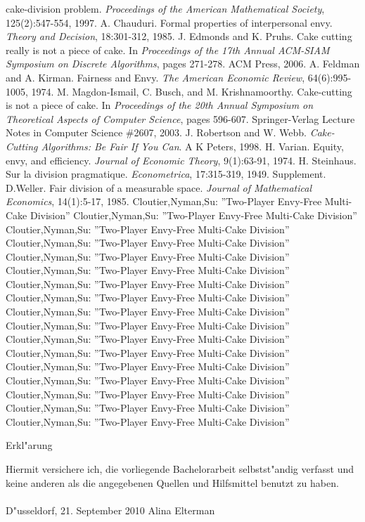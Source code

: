 \documentclass[11pt, a4paper, twoside]{article}
\newcommand{\tf}{\color{black}}
\numberwithin{equation}{section}
\begin{document}
\begin{thebibliography}{9}
cake-division problem. \emph{Proceedings of the American Mathematical Society}, 125(2):547-554,
1997.
\bibitem[Cha85]{} A. Chauduri. Formal properties of interpersonal envy. \emph{Theory and Decision}, 18:301-312, 1985.
\bibitem[EP06b]{} J. Edmonds and K. Pruhs. Cake cutting really is not a piece of cake. In \emph{Proceedings of the 17th
Annual ACM-SIAM Symposium on Discrete Algorithms}, pages 271-278. ACM Press, 2006.
\bibitem[FK74]{} A. Feldman and A. Kirman. Fairness and Envy. \emph{The American Economic Review}, 64(6):995-1005, 1974.
\bibitem[MIBK03]{} M. Magdon-Ismail, C. Busch, and M. Krishnamoorthy. Cake-cutting is not a piece of cake. In \emph{Proceedings of the 20th Annual Symposium on Theoretical Aspects of Computer Science}, pages 596-607. Springer-Verlag Lecture Notes in Computer Science \#2607, 2003.
\bibitem[RW98]{} J. Robertson and W. Webb. \emph{Cake-Cutting Algorithms: Be Fair If You Can}. A K Peters, 1998.
\bibitem[Var74]{} H. Varian. Equity, envy, and efficiency. \emph{Journal of Economic Theory}, 9(1):63-91, 1974.
\bibitem[Ste49]{} H. Steinhaus. Sur la division pragmatique. \emph{Econometrica}, 17:315-319, 1949. Supplement.
\bibitem[Wel85]{} D.Weller. Fair division of a measurable space. \emph{Journal of Mathematical Economics}, 14(1):5-17,
1985.
Cloutier,Nyman,Su:
''Two-Player Envy-Free Multi-Cake Division''
Cloutier,Nyman,Su:
''Two-Player Envy-Free Multi-Cake Division''
Cloutier,Nyman,Su:
''Two-Player Envy-Free Multi-Cake Division''
Cloutier,Nyman,Su:
''Two-Player Envy-Free Multi-Cake Division''
Cloutier,Nyman,Su:
''Two-Player Envy-Free Multi-Cake Division''
Cloutier,Nyman,Su:
''Two-Player Envy-Free Multi-Cake Division''
Cloutier,Nyman,Su:
''Two-Player Envy-Free Multi-Cake Division''
Cloutier,Nyman,Su:
''Two-Player Envy-Free Multi-Cake Division''
Cloutier,Nyman,Su:
''Two-Player Envy-Free Multi-Cake Division''
Cloutier,Nyman,Su:
''Two-Player Envy-Free Multi-Cake Division''
Cloutier,Nyman,Su:
''Two-Player Envy-Free Multi-Cake Division''
Cloutier,Nyman,Su:
''Two-Player Envy-Free Multi-Cake Division''
Cloutier,Nyman,Su:
''Two-Player Envy-Free Multi-Cake Division''
Cloutier,Nyman,Su:
''Two-Player Envy-Free Multi-Cake Division''
Cloutier,Nyman,Su:
''Two-Player Envy-Free Multi-Cake Division''
Cloutier,Nyman,Su:
''Two-Player Envy-Free Multi-Cake Division''
Cloutier,Nyman,Su:
''Two-Player Envy-Free Multi-Cake Division''
\end{thebibliography}
\newpage
\thispagestyle{empty}
\tf
\begin{center}
\Huge Erkl"arung
\end{center}
\vspace{1cm}
\noindent Hiermit versichere ich, die vorliegende Bachelorarbeit selbstst"andig verfasst und keine anderen als die angegebenen Quellen und Hilfsmittel benutzt zu haben.\\
\vspace{3cm}\\
D"usseldorf, 21. September 2010 \hfill Alina Elterman
\end{document}
